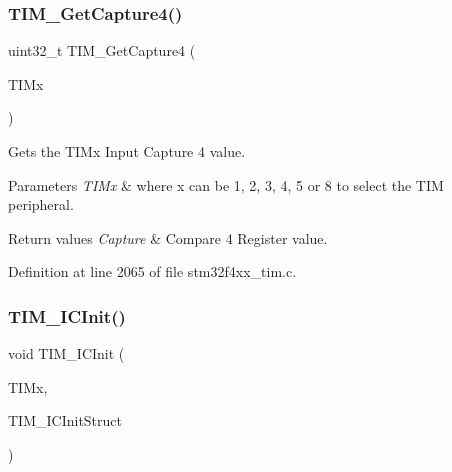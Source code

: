 \subsubsection{\texorpdfstring{T\+I\+M\+\_\+\+Get\+Capture4()}{TIM\_GetCapture4()}}
{\footnotesize\ttfamily uint32\+\_\+t T\+I\+M\+\_\+\+Get\+Capture4 (\begin{DoxyParamCaption}\item[{\hyperlink{struct_t_i_m___type_def}{T\+I\+M\+\_\+\+Type\+Def} $\ast$}]{T\+I\+Mx }\end{DoxyParamCaption})}



Gets the T\+I\+Mx Input Capture 4 value. 


\begin{DoxyParams}{Parameters}
{\em T\+I\+Mx} & where x can be 1, 2, 3, 4, 5 or 8 to select the T\+IM peripheral. \\
\hline
\end{DoxyParams}

\begin{DoxyRetVals}{Return values}
{\em Capture} & Compare 4 Register value. \\
\hline
\end{DoxyRetVals}


Definition at line 2065 of file stm32f4xx\+\_\+tim.\+c.

\mbox{\label{group___t_i_m___group3_ga9e6a153dd6552e4e1188eba227316f7f}} 
\subsubsection{\texorpdfstring{T\+I\+M\+\_\+\+I\+C\+Init()}{TIM\_ICInit()}}
{\footnotesize\ttfamily void T\+I\+M\+\_\+\+I\+C\+Init (\begin{DoxyParamCaption}\item[{\hyperlink{struct_t_i_m___type_def}{T\+I\+M\+\_\+\+Type\+Def} $\ast$}]{T\+I\+Mx,  }\item[{\hyperlink{struct_t_i_m___i_c_init_type_def}{T\+I\+M\+\_\+\+I\+C\+Init\+Type\+Def} $\ast$}]{T\+I\+M\+\_\+\+I\+C\+Init\+Struct }\end{DoxyParamCaption})}



